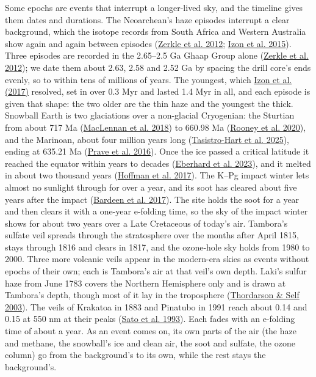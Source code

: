 \documentclass[9pt,twocolumn]{extarticle}
\begin{document}
Some epochs are events that interrupt a longer-lived sky, and the timeline gives them dates and durations. The Neoarchean's haze episodes interrupt a clear background, which the isotope records from South Africa and Western Australia show again and again between episodes (\protect\hyperlink{cite.zerkle2012}{Zerkle et al. 2012}; \protect\hyperlink{cite.izon2015}{Izon et al. 2015}). Three episodes are recorded in the 2.65--2.5 Ga Ghaap Group alone (\protect\hyperlink{cite.zerkle2012}{Zerkle et al. 2012}); we date them about 2.63, 2.58 and 2.52 Ga by spacing the drill core's ends evenly, so to within tens of millions of years. The youngest, which \protect\hyperlink{cite.izon2017}{Izon et al. (2017)} resolved, set in over 0.3 Myr and lasted 1.4 Myr in all, and each episode is given that shape: the two older are the thin haze and the youngest the thick. Snowball Earth is two glaciations over a non-glacial Cryogenian: the Sturtian from about 717 Ma (\protect\hyperlink{cite.maclennan2018}{MacLennan et al. 2018}) to 660.98 Ma (\protect\hyperlink{cite.rooney2020}{Rooney et al. 2020}), and the Marinoan, about four million years long (\protect\hyperlink{cite.tasistrohart2025}{Tasistro-Hart et al. 2025}), ending at 635.21 Ma (\protect\hyperlink{cite.prave2016}{Prave et al. 2016}). Once the ice passed a critical latitude it reached the equator within years to decades (\protect\hyperlink{cite.eberhard2023}{Eberhard et al. 2023}), and it melted in about two thousand years (\protect\hyperlink{cite.hoffman2017}{Hoffman et al. 2017}). The K--Pg impact winter lets almost no sunlight through for over a year, and its soot has cleared about five years after the impact (\protect\hyperlink{cite.bardeen2017}{Bardeen et al. 2017}). The site holds the soot for a year and then clears it with a one-year e-folding time, so the sky of the impact winter shows for about two years over a Late Cretaceous of today's air. Tambora's sulfate veil spreads through the stratosphere over the months after April 1815, stays through 1816 and clears in 1817, and the ozone-hole sky holds from 1980 to 2000. Three more volcanic veils appear in the modern-era skies as events without epochs of their own; each is Tambora's air at that veil's own depth. Laki's sulfur haze from June 1783 covers the Northern Hemisphere only and is drawn at Tambora's depth, though most of it lay in the troposphere (\protect\hyperlink{cite.thordarson2003}{Thordarson \& Self 2003}). The veils of Krakatoa in 1883 and Pinatubo in 1991 reach about 0.14 and 0.15 at 550 nm at their peaks (\protect\hyperlink{cite.sato1993}{Sato et al. 1993}). Each fades with an e-folding time of about a year. As an event comes on, its own parts of the air (the haze and methane, the snowball's ice and clean air, the soot and sulfate, the ozone column) go from the background's to its own, while the rest stays the background's.
\end{document}

